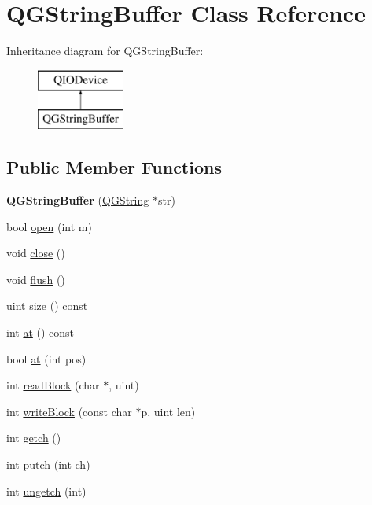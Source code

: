 \hypertarget{class_q_g_string_buffer}{}\section{Q\+G\+String\+Buffer Class Reference}
\label{class_q_g_string_buffer}
Inheritance diagram for Q\+G\+String\+Buffer\+:\begin{figure}[H]
\begin{center}
\leavevmode
\includegraphics[height=2.000000cm]{class_q_g_string_buffer}
\end{center}
\end{figure}
\subsection*{Public Member Functions}
\begin{DoxyCompactItemize}
\item 
\mbox{\label{class_q_g_string_buffer_a36c11661db62c68c4a48db5f9cdfd69c}} 
{\bfseries Q\+G\+String\+Buffer} (\mbox{\hyperlink{class_q_g_string}{Q\+G\+String}} $\ast$str)
\item 
bool \mbox{\hyperlink{class_q_g_string_buffer_afcecb219691daf1fb5f18f7324fc52b7}{open}} (int m)
\item 
void \mbox{\hyperlink{class_q_g_string_buffer_a02458102f8968ef46bfaeab319f8e2fc}{close}} ()
\item 
void \mbox{\hyperlink{class_q_g_string_buffer_a655d2990426c9a646fc4d14273fb89c0}{flush}} ()
\item 
uint \mbox{\hyperlink{class_q_g_string_buffer_ad7206e39b7cc87a42717ded03d700cd8}{size}} () const
\item 
int \mbox{\hyperlink{class_q_g_string_buffer_a8aa888c83b2a77c20fb60fa7d07a143b}{at}} () const
\item 
bool \mbox{\hyperlink{class_q_g_string_buffer_ab1bcf1133571fd71797ad11d5d7f3cb4}{at}} (int pos)
\item 
int \mbox{\hyperlink{class_q_g_string_buffer_aa5ab1052c6a1a9365418f55c55022fb2}{read\+Block}} (char $\ast$, uint)
\item 
int \mbox{\hyperlink{class_q_g_string_buffer_aab6c9a7bfbc048b4adff01f4bf920efa}{write\+Block}} (const char $\ast$p, uint len)
\item 
int \mbox{\hyperlink{class_q_g_string_buffer_a20699e4c4ba6d7d68c4422d795412751}{getch}} ()
\item 
int \mbox{\hyperlink{class_q_g_string_buffer_ae2265be83385ba58ff0e47880563bbb5}{putch}} (int ch)
\item 
int \mbox{\hyperlink{class_q_g_string_buffer_a6e97e3b078054bdeb5ee62d6970e7863}{ungetch}} (int)
\end{DoxyCompactItemize}

